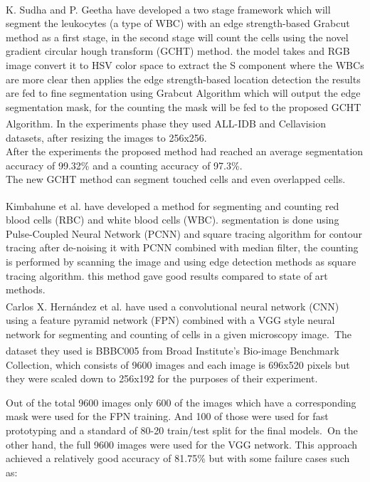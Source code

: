 {K. Sudha and P. Geetha \textsuperscript{\cite{SUDHA2020639}} have developed a two stage framework which will segment the leukocytes (a type of WBC) with an edge strength-based Grabcut method as a first stage, in the second stage will count the cells using the novel gradient circular hough transform (GCHT) method. the model takes and RGB image convert it to HSV color space to extract the S component where the WBCs are more clear then applies the edge strength-based location detection the results are fed to fine segmentation using Grabcut Algorithm which will output the edge segmentation mask, for the counting the mask will be fed to the proposed GCHT Algorithm. In the experiments phase they used ALL-IDB \textsuperscript{\cite{labati2011all}} and Cellavision \textsuperscript{\cite{Zheng2018}} datasets, after resizing the images to 256x256.\\
After the experiments the proposed method had reached an average segmentation accuracy of 99.32\% and a counting accuracy of 97.3\%.\\
The new GCHT method can segment touched cells and even overlapped cells.

Kimbahune et al. \textsuperscript{\cite{kimbahune2011blood}} have developed a method for segmenting and counting red blood cells (RBC) and white blood cells (WBC).
segmentation is done using Pulse-Coupled Neural Network (PCNN) and square tracing algorithm for contour tracing after de-noising it with PCNN combined with median filter, the counting is performed by scanning the image and using edge detection methods as square tracing algorithm. this method gave good results compared to state of art methods.\\

Carlos X. Hern{\'{a}}ndez et al. \textsuperscript{\cite{DBLP:journals/corr/abs-1802-10548}} have used a convolutional neural network (CNN) using a feature pyramid network (FPN) combined with a VGG style neural network for segmenting and counting of cells in a given microscopy image.\
The dataset they used is BBBC005 \textsuperscript{\cite{ljosa2012annotated}} from Broad Institute's Bio-image Benchmark Collection, which consists of 9600 images and each image is 696x520 pixels but they were scaled down to 256x192 for the purposes of their experiment.\

Out of the total 9600 images only 600 of the images which have a corresponding mask were used for the FPN training. And 100 of those were used for fast prototyping and a standard of 80-20 train/test split for the final models.\
On the other hand, the full 9600 images were used for the VGG network.
This approach achieved a relatively good accuracy of 81.75\% but with some failure cases such as:\

}
